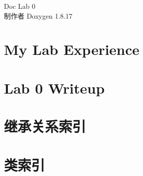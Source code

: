 \let\mypdfximage\pdfximage\def\pdfximage{\immediate\mypdfximage}\documentclass[twoside]{book}
\newcommand{\+}{\discretionary{\mbox{\scriptsize$\hookleftarrow$}}{}{}}
\newcommand{\clearemptydoublepage}{%
  \newpage{\pagestyle{empty}\cleardoublepage}%
}
\begin{document}
\begin{CJK}{UTF8}{min}

\hypersetup{pageanchor=false,
             bookmarksnumbered=true,
             pdfencoding=unicode
            }
\begin{titlepage}
\vspace*{7cm}
\begin{center}%
{\Large Doc Lab 0 }\\
\vspace*{1cm}
{\large 制作者 Doxygen 1.8.17}\\
\end{center}
\end{titlepage}
\clearemptydoublepage
{}
\tableofcontents
\clearemptydoublepage
{}
\hypersetup{pageanchor=true}

\chapter{My Lab Experience}
\label{md_README}

\chapter{Lab 0 Writeup}
\label{md_writeups_lab0}

\chapter{继承关系索引}

\chapter{类索引}


\end{CJK}
\end{document}
